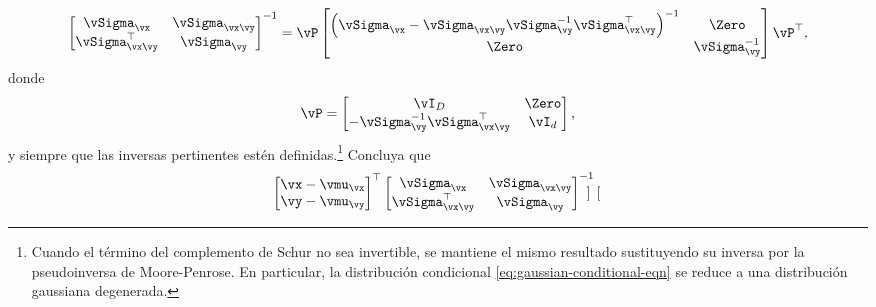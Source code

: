 \documentclass[../../book-main.tex]{subfiles}
\begin{document}
\begin{exercise}
\begin{enumerate}
            \begin{equation}\label{eq:gaussian-conditional-covariance-inverse-block}
                \begin{bmatrix}
                    \vSigma_{\vx} & \vSigma_{\vx\vy} \\
                    \vSigma_{\vx\vy}^\top & \vSigma_{\vy}
                \end{bmatrix}^{-1}
                =
                \vP
                \begin{bmatrix}
                    \left(\vSigma_{\vx} - \vSigma_{\vx\vy}
                        \vSigma_{\vy}^{-1}
                    \vSigma_{\vx\vy}^{\top}\right)^{-1} & \Zero \\
                    \Zero & \vSigma_{\vy}^{-1}
                \end{bmatrix}
                \vP^\top,
            \end{equation}
            donde
            \begin{equation}
                \vP =
                \begin{bmatrix}
                    \vI_D & \Zero\\
                    -\vSigma_{\vy}^{-1}\vSigma_{\vx\vy}^\top & \vI_d
                \end{bmatrix},
            \end{equation}
            y siempre que las inversas pertinentes estén
            definidas.\footnote{Cuando el
                término del complemento de Schur no sea invertible, se mantiene el mismo
                resultado sustituyendo su
                inversa por la pseudoinversa de Moore-Penrose.
                En particular, la
                distribución condicional
                \eqref{eq:gaussian-conditional-eqn} se reduce a
            una distribución gaussiana degenerada.}
            Concluya que
            \begin{align}
                &
                \begin{bmatrix}
                    \vx-\vmu_{\vx} \\
                    \vy-\vmu_{\vy}
                \end{bmatrix}^{\top}
                \begin{bmatrix}
                    \vSigma_{\vx} & \vSigma_{\vx\vy} \\
                    \vSigma_{\vx\vy}^\top & \vSigma_{\vy}
                \end{bmatrix}^{-1}
                \begin{bmatrix}

\end{bmatrix}
\end{align}
\end{enumerate}
\end{exercise}
\end{document}
